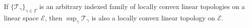 If $\{\mathcal{T}_\gamma\}_{\gamma \in \Gamma}$ is an arbitrary indexed family of locally convex linear topologies on a linear space $\mathcal{E}$, then $\sup_{\gamma} \mathcal{T}_\gamma$ is also a locally convex linear topology on $\mathcal{E}$.
